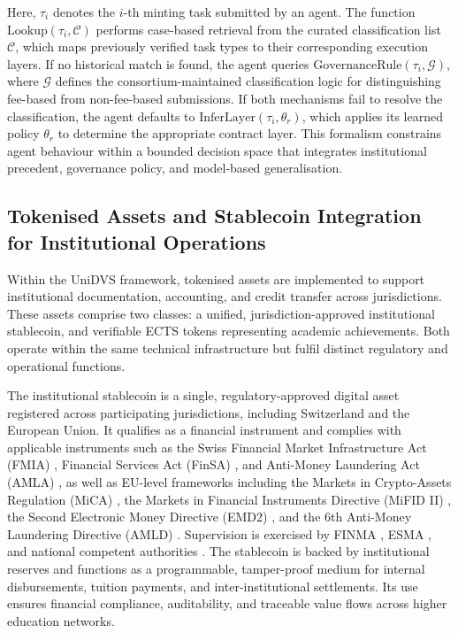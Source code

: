 \documentclass[oneside,10pt]{swissi}
\begin{document}
Here, $\tau_i$ denotes the $i$-th minting task submitted by an agent. The function $\text{Lookup}(\tau_i, \mathcal{C})$ performs case-based retrieval from the curated classification list $\mathcal{C}$, which maps previously verified task types to their corresponding execution layers. If no historical match is found, the agent queries $\text{GovernanceRule}(\tau_i, \mathcal{G})$, where $\mathcal{G}$ defines the consortium-maintained classification logic for distinguishing fee-based from non-fee-based submissions. If both mechanisms fail to resolve the classification, the agent defaults to $\text{InferLayer}(\tau_i, \theta_r)$, which applies its learned policy $\theta_r$ to determine the appropriate contract layer. This formalism constrains agent behaviour within a bounded decision space that integrates institutional precedent, governance policy, and model-based generalisation.

\subsection{Tokenised Assets and Stablecoin Integration for Institutional Operations}

Within the UniDVS framework, tokenised assets are implemented to support institutional documentation, accounting, and credit transfer across jurisdictions. These assets comprise two classes: a unified, jurisdiction-approved institutional stablecoin, and verifiable ECTS tokens representing academic achievements. Both operate within the same technical infrastructure but fulfil distinct regulatory and operational functions.

The institutional stablecoin is a single, regulatory-approved digital asset registered across participating jurisdictions, including Switzerland and the European Union. It qualifies as a financial instrument and complies with applicable instruments such as the Swiss Financial Market Infrastructure Act (FMIA) \cite{ch2016fima}, Financial Services Act (FinSA) \cite{ch2018finsa}, and Anti-Money Laundering Act (AMLA) \cite{ch2021amla}, as well as EU-level frameworks including the Markets in Crypto-Assets Regulation (MiCA) \cite{eu2023mica}, the Markets in Financial Instruments Directive (MiFID II) \cite{eu2014mifid2}, the Second Electronic Money Directive (EMD2) \cite{eu2009emd2}, and the 6th Anti-Money Laundering Directive (AMLD) \cite{eu2018amld6}. Supervision is exercised by FINMA \cite{finma2024}, ESMA \cite{esma2024}, and national competent authorities \cite{bafin2024,fma2024}. The stablecoin is backed by institutional reserves and functions as a programmable, tamper-proof medium for internal disbursements, tuition payments, and inter-institutional settlements. Its use ensures financial compliance, auditability, and traceable value flows across higher education networks.
\end{document}
